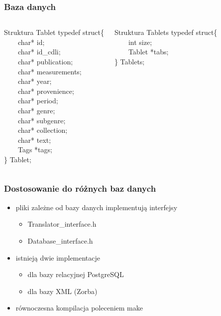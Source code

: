\begin{frame}
 \frametitle{Baza danych}
\begin{columns}[t]
\begin{block}{Struktura Tablet}
typedef struct\{ \\
~~~~char* id; \\
~~~~char* id\_cdli; \\
~~~~char* publication; \\
~~~~char* measurements; \\
~~~~char* year; \\
~~~~char* provenience; \\
~~~~char* period; \\
~~~~char* genre; \\
~~~~char* subgenre; \\
~~~~char* collection; \\
~~~~char* text; \\
~~~~Tags *tags; \\
\} Tablet; \\
\end{block}
\begin{block}{Struktura Tablets}
typedef struct\{ \\
~~~~int size; \\
~~~~Tablet *tabs; \\
\} Tablets;
\end{block}
\end{columns}

\end{frame}

\begin{frame}
 \frametitle{Dostosowanie do różnych baz danych}
\begin{itemize}
\item pliki zależne od bazy danych implementują interfejsy
\begin{itemize}
\item Translator\_interface.h
\item Database\_interface.h
\end{itemize}
\item istnieją dwie implementacje
\begin{itemize}
\item dla bazy relacyjnej PostgreSQL
\item dla bazy XML (Zorba)
\end{itemize}
\item równoczesna kompilacja poleceniem make
\end{itemize}
\end{frame}





